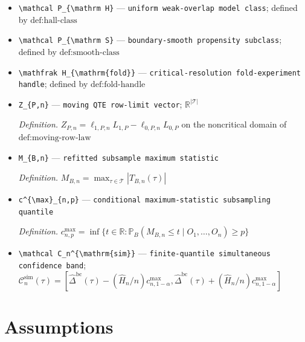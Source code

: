 \documentclass{article}
\begin{document}
\begin{itemize}
  \item \texttt{\textbackslash{}\allowbreak{}mathcal P\_\allowbreak{}\{\textbackslash{}\allowbreak{}mathrm H\}\allowbreak{}} --- \texttt{uniform weak-\allowbreak{}overlap model class}; defined by \(\text{def:hall-class}\)
  \item \texttt{\textbackslash{}\allowbreak{}mathcal P\_\allowbreak{}\{\textbackslash{}\allowbreak{}mathrm S\}\allowbreak{}} --- \texttt{boundary-\allowbreak{}smooth propensity subclass}; defined by \(\text{def:smooth-class}\)
  \item \texttt{\textbackslash{}\allowbreak{}mathfrak H\_\allowbreak{}\{\textbackslash{}\allowbreak{}mathrm\{fold\}\allowbreak{}\}\allowbreak{}} --- \texttt{critical-\allowbreak{}resolution fold-\allowbreak{}experiment handle}; defined by \(\text{def:fold-handle}\)
  \item \texttt{Z\_\allowbreak{}\{P,\allowbreak{}n\}\allowbreak{}} --- \texttt{moving QTE row-\allowbreak{}limit vector}; \(\mathbb R^{|\mathcal T|}\)
  \par\smallskip\noindent\emph{Definition.} \(Z_{P,n}=\ell_{1,P,n}L_{1,P}-\ell_{0,P,n}L_{0,P}\) on the noncritical domain of \(\text{def:moving-row-law}\)
  \item \texttt{M\_\allowbreak{}\{B,\allowbreak{}n\}\allowbreak{}} --- \texttt{refitted subsample maximum statistic}
  \par\smallskip\noindent\emph{Definition.} \(M_{B,n}=\max_{\tau\in\mathcal T}|T_{B,n}(\tau)|\)
  \item \texttt{c\textasciicircum{}\{\textbackslash{}\allowbreak{}max\}\allowbreak{}\_\allowbreak{}\{n,\allowbreak{}p\}\allowbreak{}} --- \texttt{conditional maximum-\allowbreak{}statistic subsampling quantile}
  \par\smallskip\noindent\emph{Definition.} \(c^{\max}_{n,p}=\inf\{t\in\mathbb R:\mathbb P_B(M_{B,n}\le t\mid O_1,\ldots,O_n)\ge p\}\)
  \item \texttt{\textbackslash{}\allowbreak{}mathcal C\_\allowbreak{}n\textasciicircum{}\{\textbackslash{}\allowbreak{}mathrm\{sim\}\allowbreak{}\}\allowbreak{}} --- \texttt{finite-\allowbreak{}quantile simultaneous confidence band}; \(\mathcal C_n^{\mathrm{sim}}(\tau)=[\widehat\Delta^{\mathrm{bc}}(\tau)-(\widehat H_n/n)c^{\max}_{n,1-\alpha},\widehat\Delta^{\mathrm{bc}}(\tau)+(\widehat H_n/n)c^{\max}_{n,1-\alpha}]\)
\end{itemize}

\section{Assumptions}
\end{document}
